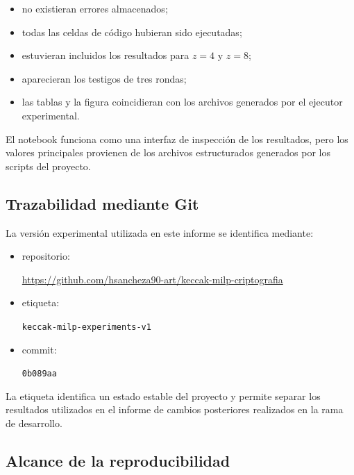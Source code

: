 \begin{itemize}
    \item no existieran errores almacenados;
    \item todas las celdas de código hubieran sido ejecutadas;
    \item estuvieran incluidos los resultados para $z=4$ y $z=8$;
    \item aparecieran los testigos de tres rondas;
    \item las tablas y la figura coincidieran con los archivos generados
    por el ejecutor experimental.
\end{itemize}

El notebook funciona como una interfaz de inspección de los resultados,
pero los valores principales provienen de los archivos estructurados
generados por los scripts del proyecto.


\subsection{Trazabilidad mediante Git}
\label{subsec:trazabilidad_git}

La versión experimental utilizada en este informe se identifica mediante:

\begin{itemize}
    \item repositorio:

    \begin{center}
    \url{https://github.com/hsancheza90-art/keccak-milp-criptografia}
    \end{center}

    \item etiqueta:

    \begin{center}
    \texttt{keccak-milp-experiments-v1}
    \end{center}

    \item commit:

    \begin{center}
    \texttt{0b089aa}
    \end{center}
\end{itemize}

La etiqueta identifica un estado estable del proyecto y permite separar los
resultados utilizados en el informe de cambios posteriores realizados en la
rama de desarrollo.


\subsection{Alcance de la reproducibilidad}
\label{subsec:alcance_reproducibilidad}

